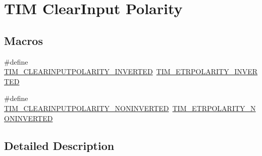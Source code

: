 \hypertarget{group___t_i_m___clear_input___polarity}{\section{T\-I\-M Clear\-Input Polarity}
\label{group___t_i_m___clear_input___polarity}
}
\subsection*{Macros}
\begin{DoxyCompactItemize}
\item 
\#define \hyperlink{group___t_i_m___clear_input___polarity_ga02e0d10a2cf90016d1a8be1931c6c67e}{T\-I\-M\-\_\-\-C\-L\-E\-A\-R\-I\-N\-P\-U\-T\-P\-O\-L\-A\-R\-I\-T\-Y\-\_\-\-I\-N\-V\-E\-R\-T\-E\-D}~\hyperlink{group___t_i_m___e_t_r___polarity_ga42652ff688f0042659f8304ae08abfa6}{T\-I\-M\-\_\-\-E\-T\-R\-P\-O\-L\-A\-R\-I\-T\-Y\-\_\-\-I\-N\-V\-E\-R\-T\-E\-D}
\item 
\#define \hyperlink{group___t_i_m___clear_input___polarity_ga53e02f7692e6996389b462219572f2a9}{T\-I\-M\-\_\-\-C\-L\-E\-A\-R\-I\-N\-P\-U\-T\-P\-O\-L\-A\-R\-I\-T\-Y\-\_\-\-N\-O\-N\-I\-N\-V\-E\-R\-T\-E\-D}~\hyperlink{group___t_i_m___e_t_r___polarity_ga7fa7c43245b25564414b2e191d5d8b14}{T\-I\-M\-\_\-\-E\-T\-R\-P\-O\-L\-A\-R\-I\-T\-Y\-\_\-\-N\-O\-N\-I\-N\-V\-E\-R\-T\-E\-D}
\end{DoxyCompactItemize}


\subsection{Detailed Description}


